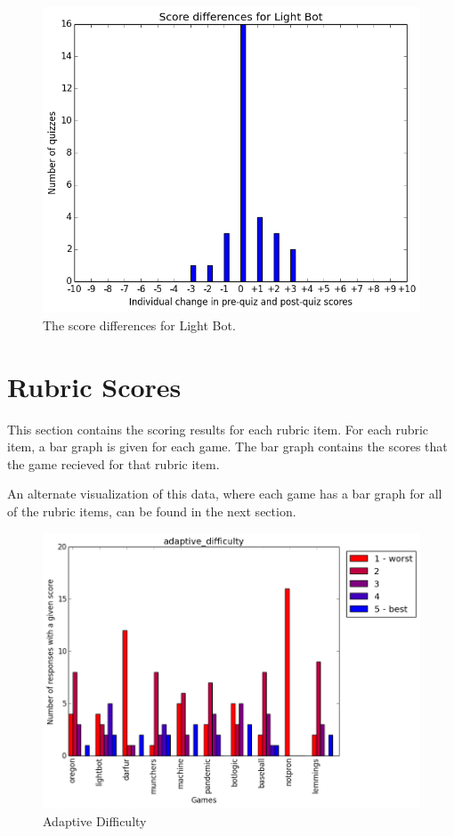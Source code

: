 			\begin{figure}[] 
			\centering 
			\includegraphics[width=\textwidth]{lightbot_results.png} 
			\caption{The score differences for Light Bot.}
			\end{figure}

			\clearpage

		\section{Rubric Scores}
			This section contains the scoring results for each rubric item. For each rubric item, a bar graph is given for each game. The bar graph contains the scores that the game recieved for that rubric item.

			An alternate visualization of this data, where each game has a bar graph for all of the rubric items, can be found in the next section.

			\begin{figure}[] 
			\centering 
			\includegraphics[width=\textwidth]{adaptive_difficulty_scores.png} 
			\caption{Adaptive Difficulty}
			\end{figure}

